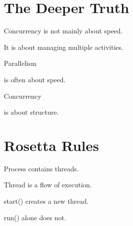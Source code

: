 \documentclass[11pt,a4paper]{book}
\begin{document}
\section{The Deeper Truth}

Concurrency is not mainly
about speed.


It is about managing
multiple activities.


Parallelism

is often about speed.


Concurrency

is about structure.


\section{Rosetta Rules}

\begin{rosettarule}

Process contains threads.

\end{rosettarule}


\begin{rosettarule}

Thread is a flow of execution.

\end{rosettarule}


\begin{rosettarule}

start() creates a new thread.

\end{rosettarule}


\begin{rosettarule}

run() alone does not.

\end{rosettarule}
\end{document}
